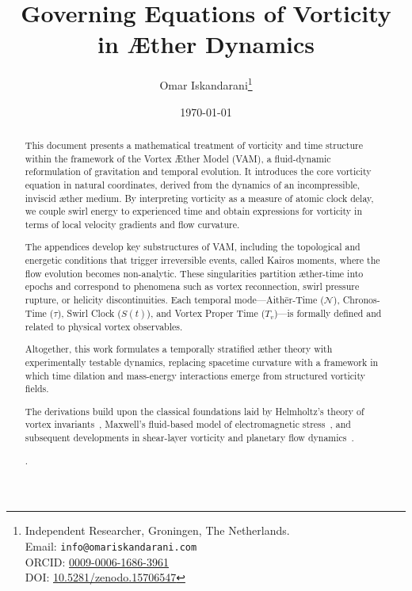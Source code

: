\documentclass[a4paper,12pt]{article}
\title{ Governing Equations of Vorticity in Æther Dynamics \\[0.5em]}
\author{
    Omar Iskandarani\thanks{
        Independent Researcher, Groningen, The Netherlands.\\
        Email: \texttt{info@omariskandarani.com}\\
        ORCID: \href{https://orcid.org/0009-0006-1686-3961}{0009-0006-1686-3961}\\
        DOI: \href{https://doi.org/10.5281/zenodo.15706547}{10.5281/zenodo.15706547}
    }
}
\date{\today}
\begin{document}
    \maketitle
    \vspace{-2ex}


    \begin{abstract}
        This document presents a mathematical treatment of vorticity and time structure within the framework of the Vortex Æther Model (VAM), a fluid-dynamic reformulation of gravitation and temporal evolution. It introduces the core vorticity equation in natural coordinates, derived from the dynamics of an incompressible, inviscid æther medium. By interpreting vorticity as a measure of atomic clock delay, we couple swirl energy to experienced time and obtain expressions for vorticity in terms of local velocity gradients and flow curvature.

        The appendices develop key substructures of VAM, including the topological and energetic conditions that trigger irreversible events, called Kairos moments, where the flow evolution becomes non-analytic. These singularities partition æther-time into epochs and correspond to phenomena such as vortex reconnection, swirl pressure rupture, or helicity discontinuities. Each temporal mode—Aithēr-Time (\( \mathcal{N} \)), Chronos-Time (\( \tau \)), Swirl Clock (\( S(t) \)), and Vortex Proper Time (\( T_v \))—is formally defined and related to physical vortex observables.

        Altogether, this work formulates a temporally stratified æther theory with experimentally testable dynamics, replacing spacetime curvature with a framework in which time dilation and mass-energy interactions emerge from structured vorticity fields.

        The derivations build upon the classical foundations laid by Helmholtz's theory of vortex invariants~\cite{helmholtz1858integralsvortex}, Maxwell's fluid-based model of electromagnetic stress~\cite{maxwell1861pressure}, and subsequent developments in shear-layer vorticity and planetary flow dynamics~\cite{lamb1932, rossby1939}.



.

    \end{abstract}


    \vfill
%
    \newpage
    \tableofcontents
    \newpage


    \appendix
    \def\standalonechapter{false}
    
    
    
    

    
    
\end{document}
